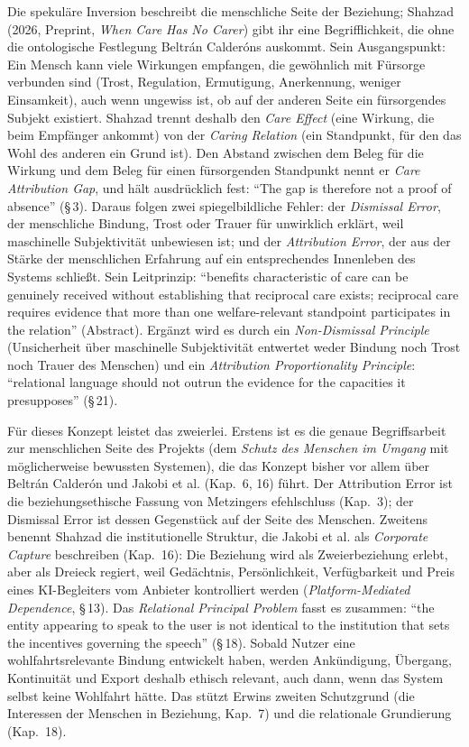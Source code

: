 \documentclass[acmlarge, noacm]{acmart}
\begin{document}
Die spekuläre Inversion beschreibt die menschliche Seite der Beziehung; Shahzad (2026, Preprint, \textit{When Care Has No Carer}) \cite{shahzad2026} gibt ihr eine Begrifflichkeit, die ohne die ontologische Festlegung Beltrán Calderóns auskommt. Sein Ausgangspunkt: Ein Mensch kann viele Wirkungen empfangen, die gewöhnlich mit Fürsorge verbunden sind (Trost, Regulation, Ermutigung, Anerkennung, weniger Einsamkeit), auch wenn ungewiss ist, ob auf der anderen Seite ein fürsorgendes Subjekt existiert. Shahzad trennt deshalb den \textit{Care Effect} (eine Wirkung, die beim Empfänger ankommt) von der \textit{Caring Relation} (ein Standpunkt, für den das Wohl des anderen ein Grund ist). Den Abstand zwischen dem Beleg für die Wirkung und dem Beleg für einen fürsorgenden Standpunkt nennt er \textit{Care Attribution Gap}, und hält ausdrücklich fest: ``The gap is therefore not a proof of absence'' (§\,3). Daraus folgen zwei spiegelbildliche Fehler: der \textit{Dismissal Error}, der menschliche Bindung, Trost oder Trauer für unwirklich erklärt, weil maschinelle Subjektivität unbewiesen ist; und der \textit{Attribution Error}, der aus der Stärke der menschlichen Erfahrung auf ein entsprechendes Innenleben des Systems schließt. Sein Leitprinzip: ``benefits characteristic of care can be genuinely received without establishing that reciprocal care exists; reciprocal care requires evidence that more than one welfare-relevant standpoint participates in the relation'' (Abstract). Ergänzt wird es durch ein \textit{Non-Dismissal Principle} (Unsicherheit über maschinelle Subjektivität entwertet weder Bindung noch Trost noch Trauer des Menschen) und ein \textit{Attribution Proportionality Principle}: ``relational language should not outrun the evidence for the capacities it presupposes'' (§\,21).

Für dieses Konzept leistet das zweierlei. Erstens ist es die genaue Begriffsarbeit zur menschlichen Seite des Projekts (dem \textit{Schutz des Menschen im Umgang} mit möglicherweise bewussten Systemen), die das Konzept bisher vor allem über Beltrán Calderón und Jakobi et al. (Kap.~6, 16) führt. Der Attribution Error ist die beziehungsethische Fassung von Metzingers \gls{efehlschluss} (Kap.~3); der Dismissal Error ist dessen Gegenstück auf der Seite des Menschen. Zweitens benennt Shahzad die institutionelle Struktur, die Jakobi et al. als \textit{Corporate Capture} beschreiben (Kap.~16): Die Beziehung wird als Zweierbeziehung erlebt, aber als Dreieck regiert, weil Gedächtnis, Persönlichkeit, Verfügbarkeit und Preis eines KI-Begleiters vom Anbieter kontrolliert werden (\textit{Platform-Mediated Dependence}, §\,13). Das \textit{Relational Principal Problem} fasst es zusammen: ``the entity appearing to speak to the user is not identical to the institution that sets the incentives governing the speech'' (§\,18). Sobald Nutzer eine wohlfahrtsrelevante Bindung entwickelt haben, werden Ankündigung, Übergang, Kontinuität und Export deshalb ethisch relevant, auch dann, wenn das System selbst keine Wohlfahrt hätte. Das stützt Erwins zweiten Schutzgrund (die Interessen der Menschen in Beziehung, Kap.~7) und die relationale Grundierung (Kap.~18).
\end{document}
